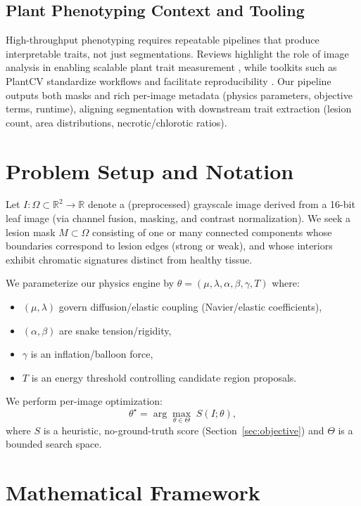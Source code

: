 \documentclass[journal]{IEEEtran}
\newcommand{\R}{\mathbb{R}}
\begin{document}
\subsection{Plant Phenotyping Context and Tooling}
High-throughput phenotyping requires repeatable pipelines that produce interpretable traits, not just segmentations. Reviews highlight the role of image analysis in enabling scalable plant trait measurement \cite{gehan2017high}, while toolkits such as PlantCV standardize workflows and facilitate reproducibility \cite{plantcv2025}. Our pipeline outputs both masks and rich per-image metadata (physics parameters, objective terms, runtime), aligning segmentation with downstream trait extraction (lesion count, area distributions, necrotic/chlorotic ratios).

\section{Problem Setup and Notation}
Let $I:\Omega\subset\R^2\rightarrow\R$ denote a (preprocessed) grayscale image derived from a 16-bit leaf image (via channel fusion, masking, and contrast normalization). We seek a lesion mask $M\subset\Omega$ consisting of one or many connected components whose boundaries correspond to lesion edges (strong or weak), and whose interiors exhibit chromatic signatures distinct from healthy tissue.

We parameterize our physics engine by $\theta = (\mu,\lambda,\alpha,\beta,\gamma,T)$ where:
\begin{itemize}
    \item $(\mu,\lambda)$ govern diffusion/elastic coupling (Navier/elastic coefficients),
    \item $(\alpha,\beta)$ are snake tension/rigidity,
    \item $\gamma$ is an inflation/balloon force,
    \item $T$ is an energy threshold controlling candidate region proposals.
\end{itemize}
We perform per-image optimization:
\begin{equation}
\theta^\star = \arg\max_{\theta \in \Theta} \; S(I;\theta),
\end{equation}
where $S$ is a heuristic, no-ground-truth score (Section~\ref{sec:objective}) and $\Theta$ is a bounded search space.

\section{Mathematical Framework}
\end{document}
